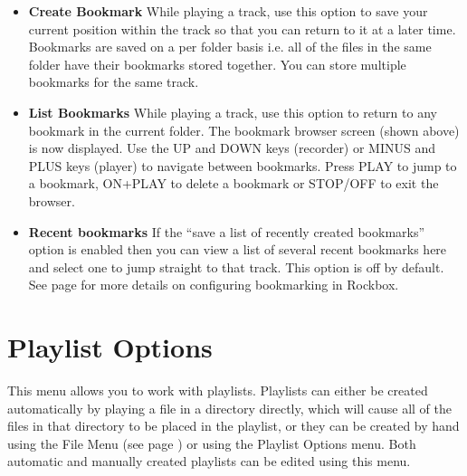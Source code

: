 \begin{itemize}
  
\item \textbf{Create Bookmark}
  While playing a track, use this option to save your current position within the track so that you can return to it at a later time.  Bookmarks are saved on a per folder basis i.e. all of the files in the same folder have their bookmarks stored together. You can store multiple bookmarks for the same track.
  
\item \textbf{List Bookmarks}
  While playing a track, use this option to return to any bookmark in the current folder.  The bookmark browser screen (shown above) is now displayed.  Use the UP and DOWN keys (recorder) or MINUS and PLUS keys (player) to navigate between bookmarks.  Press PLAY to jump to a bookmark, ON+PLAY to delete a bookmark or STOP/OFF to exit the browser.
  
\item \textbf {Recent bookmarks}
  If the ``save a list of recently created bookmarks'' option is enabled then you can view a list of several recent bookmarks here and select one to jump straight to that track.  This option is off by default. See page \pageref{ref:Bookmarkconfigactual} for more details on configuring bookmarking in Rockbox.
\end{itemize}

\section{\label{ref:playlistoptions}Playlist Options}
This menu allows you to work with playlists. Playlists can either be created automatically by playing a file in a directory directly, which will cause all of the files in that directory to be placed in the playlist, or they can be created by hand using the File Menu (see page \pageref{ref:Filemenu}) or using the Playlist Options menu.  Both  automatic and manually created playlists can be edited using this menu.

